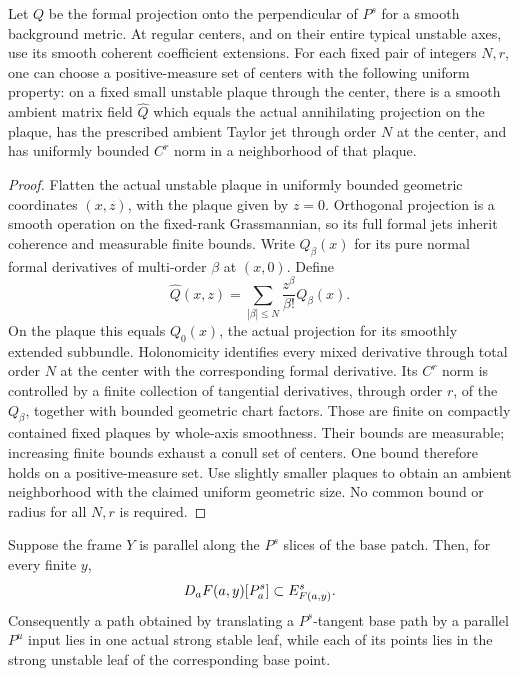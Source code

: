 \begin{lemma}\label{real:normal-extension}
Let $Q$ be the formal projection onto the perpendicular of $P^s$
for a smooth background metric. At regular centers, and on their
entire typical unstable axes, use its smooth coherent coefficient
extensions. For each fixed pair of integers $N,r$, one can choose
a positive-measure set of centers with the following uniform
property: on a fixed small unstable plaque through the center,
there is a smooth ambient matrix field $\widehat Q$ which equals
the actual annihilating projection on the plaque, has the prescribed
ambient Taylor jet through order $N$ at the center, and has
uniformly bounded $C^r$ norm in a neighborhood of that plaque.
\end{lemma}

\begin{proof}
Flatten the actual unstable plaque in uniformly bounded geometric
coordinates $(x,z)$, with the plaque given by $z=0$. Orthogonal
projection is a smooth operation on the fixed-rank Grassmannian,
so its full formal jets inherit coherence and measurable finite
bounds. Write $Q_\beta(x)$ for its pure normal formal derivatives
of multi-order $\beta$ at $(x,0)$. Define
\[
 \widehat Q(x,z)
   =\sum_{|\beta|\le N}\frac{z^\beta}{\beta!}Q_\beta(x).
\]
On the plaque this equals $Q_0(x)$, the actual projection for its
smoothly extended subbundle. Holonomicity identifies every mixed
derivative through total order $N$ at the center with the
corresponding formal derivative. Its $C^r$ norm is controlled by
a finite collection of tangential derivatives, through order $r$,
of the $Q_\beta$, together with bounded geometric chart factors.
Those are finite on compactly contained fixed plaques by
whole-axis smoothness. Their bounds are measurable; increasing
finite bounds exhaust a conull set of centers. One bound therefore
holds on a positive-measure set. Use slightly smaller plaques to
obtain an ambient neighborhood with the claimed uniform geometric
size. No common bound or radius for all $N,r$ is required.
\end{proof}

\begin{proposition}\label{real:stable-tangency}
Suppose the frame $Y$ is parallel along the $P^s$ slices of the
base patch. Then, for every finite $y$,
\begin{equation}\label{real:rectangle-tangency}
 D_aF(a,y)[P^s_a]\subset E^s_{F(a,y)}.
\end{equation}
Consequently a path obtained by translating a $P^s$-tangent base
path by a parallel $P^u$ input lies in one actual strong stable
leaf, while each of its points lies in the strong unstable leaf
of the corresponding base point.
\end{proposition}


